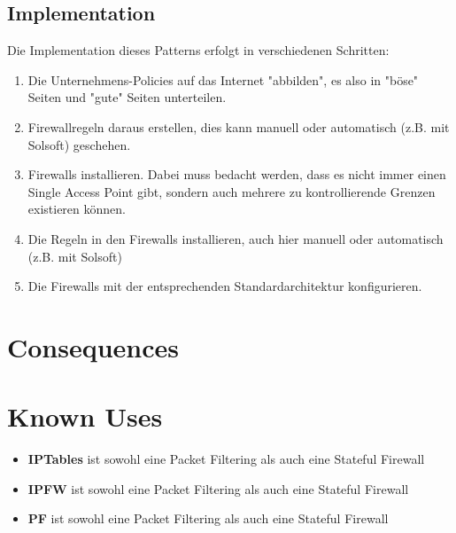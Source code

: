 \subsection{Implementation}
Die Implementation dieses Patterns erfolgt in verschiedenen Schritten:
\begin{enumerate}
  \item Die Unternehmens-Policies auf das Internet "abbilden", es also in "böse" Seiten und "gute" Seiten unterteilen.
  \item Firewallregeln daraus erstellen, dies kann manuell oder automatisch (z.B. mit Solsoft) geschehen.
  \item Firewalls installieren. Dabei muss bedacht werden, dass es nicht immer einen Single Access Point gibt, sondern auch mehrere zu kontrollierende Grenzen existieren können.
  \item Die Regeln in den Firewalls installieren, auch hier manuell oder automatisch (z.B. mit Solsoft)
  \item Die Firewalls mit der entsprechenden Standardarchitektur konfigurieren.
\end{enumerate}

\section{Consequences}
\begin{itemize}
\end{itemize}

\section{Known Uses}
\begin{itemize}
  \item \textbf{IPTables} ist sowohl eine Packet Filtering als auch eine Stateful Firewall
  \item \textbf{IPFW} ist sowohl eine Packet Filtering als auch eine Stateful Firewall
  \item \textbf{PF} ist sowohl eine Packet Filtering als auch eine Stateful Firewall
\end{itemize}


